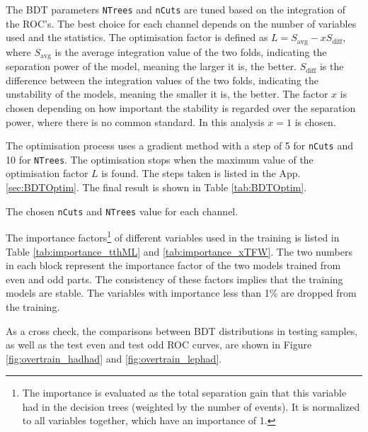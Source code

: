 The BDT parameters \texttt{NTrees} and \texttt{nCuts} are tuned based on the integration of the ROC's. The best choice for each channel depends on the number of variables used and the statistics. The optimisation factor is defined as $L=S_\mathrm{avg}-xS_\mathrm{diff}$, where $S_\mathrm{avg}$ is the average integration value of the two folds, indicating the separation power of the model, meaning the larger it is, the better. $S_\mathrm{diff}$ is the difference between the integration values of the two folds, indicating the unstability of the models, meaning the smaller it is, the better. The factor $x$ is chosen depending on how important the stability is regarded over the separation power, where there is no common standard. In this analysis $x=1$ is chosen.

The optimisation process uses a gradient method with a step of 5 for \texttt{nCuts} and 10 for \texttt{NTrees}. The optimisation stops when the maximum value of the optimisation factor $L$ is found. The steps taken is listed in the App. \ref{sec:BDTOptim}. The final result is shown in Table \ref{tab:BDTOptim}.

%

\begin{table}
\caption{The chosen \texttt{nCuts} and \texttt{NTrees} value for each channel.}
\label{tab:BDTOptim}


\end{table}

The importance factors\footnote{
The importance is evaluated as the total separation gain that this variable had in the decision trees (weighted by the number of events). It is normalized to all variables together, which have an importance of 1.
}
of different variables used in the training is listed in Table \ref{tab:importance_tthML} and \ref{tab:importance_xTFW}. The two numbers in each block represent the importance factor of the two models trained from even and odd parts. The consistency of these factors implies that the training models are stable. The variables with importance less than 1\% are dropped from the training.



As a cross check, the comparisons between BDT distributions in testing samples, as well as the test even and test odd ROC curves, are shown in Figure \ref{fig:overtrain_hadhad} and \ref{fig:overtrain_lephad}.





